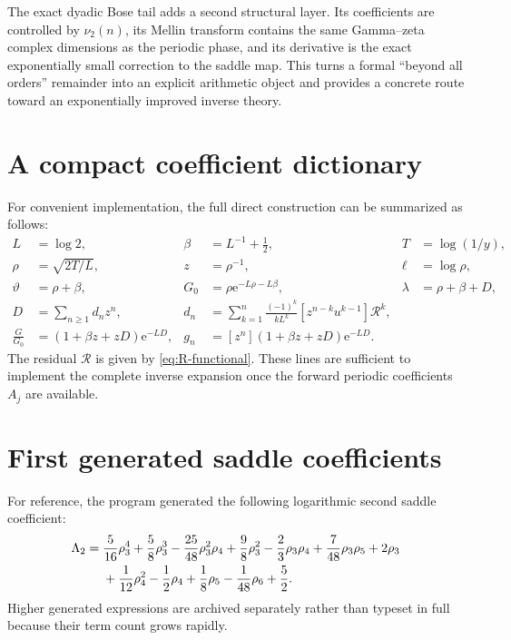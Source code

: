 \documentclass[11pt,oneside]{article}
\numberwithin{equation}{section}
\theoremstyle{definition}
\theoremstyle{remark}
\newcommand{\e}{\mathrm e}
\newcommand{\vTwo}{\nu_2}
\newcommand{\phase}{\vartheta}
\begin{document}
The exact dyadic Bose tail adds a second structural layer.  Its coefficients
are controlled by $\vTwo(n)$, its Mellin transform contains the same
Gamma--zeta complex dimensions as the periodic phase, and its derivative is
the exact exponentially small correction to the saddle map.  This turns a
formal ``beyond all orders'' remainder into an explicit arithmetic object and
provides a concrete route toward an exponentially improved inverse theory.

\appendix

\section{A compact coefficient dictionary}
\label{app:dictionary}

For convenient implementation, the full direct construction can be summarized
as follows:
\begin{align*}
 L&=\log2,
 &\beta&=L^{-1}+\tfrac12,
 &T&=\log(1/y),\\
 \rho&=\sqrt{2T/L},
 &z&=\rho^{-1},
 &\ell&=\log\rho,\\
 \phase&=\rho+\beta,
 &G_0&=\rho\e^{-L\rho-L\beta},
 &\lambda&=\rho+\beta+D,\\
 D&=\sum_{n\ge1}d_nz^n,
 &d_n&=\sum_{k=1}^n\frac{(-1)^k}{kL^k}
 [z^{n-k}u^{k-1}]\mathcal R^k,\\
 \frac{G}{G_0}&=(1+\beta z+zD)\e^{-LD},
 &g_n&=[z^n](1+\beta z+zD)\e^{-LD}.
\end{align*}
The residual $\mathcal R$ is given by \eqref{eq:R-functional}.  These lines
are sufficient to implement the complete inverse expansion once the forward
periodic coefficients $A_j$ are available.

\section{First generated saddle coefficients}
\label{app:generated}

For reference, the program generated the following logarithmic second saddle
coefficient:
\begin{align}
 \Lambda_2={}&\frac5{16}\rho_3^4+\frac58\rho_3^3
 -\frac{25}{48}\rho_3^2\rho_4+\frac98\rho_3^2
 -\frac23\rho_3\rho_4+\frac7{48}\rho_3\rho_5+2\rho_3
 \notag\\
 &+\frac1{12}\rho_4^2-\frac12\rho_4
 +\frac18\rho_5-\frac1{48}\rho_6+\frac52.
 \label{eq:Lambda2-expanded}
\end{align}
Higher generated expressions are archived separately rather than typeset in
full because their term count grows rapidly.
\end{document}

